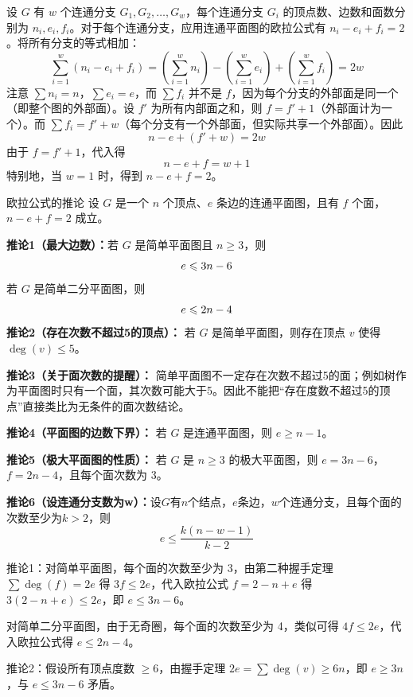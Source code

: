 设 $G$ 有 $w$ 个连通分支 $G_1, G_2, \dots, G_w$，每个连通分支 $G_i$ 的顶点数、边数和面数分别为 $n_i, e_i, f_i$。对于每个连通分支，应用连通平面图的欧拉公式有 $n_i - e_i + f_i = 2$。将所有分支的等式相加：
\[
\sum_{i=1}^w (n_i - e_i + f_i) =\left(\sum_{i=1}^w n_i\right) - \left(\sum_{i=1}^w e_i\right) + \left(\sum_{i=1}^w f_i\right) = 2w
\]
注意 $\sum n_i = n$，$\sum e_i = e$，而 $\sum f_i$ 并不是 $f$，因为每个分支的外部面是同一个（即整个图的外部面）。设 $f'$ 为所有内部面之和，则 $f = f' + 1$（外部面计为一个）。而 $\sum f_i = f' + w$（每个分支有一个外部面，但实际共享一个外部面）。因此
\[
n - e + (f' + w) = 2w
\]
由于 $f = f' + 1$，代入得
\[
n - e + f = w + 1
\]
特别地，当 $w=1$ 时，得到 $n - e + f = 2$。
\begin{theorem}{欧拉公式的推论}{}
    设 $G$ 是一个 $n$ 个顶点、$e$ 条边的连通平面图，且有 $f$ 个面，$n-e+f=2$ 成立。

\textbf{推论1（最大边数）：}若 $G$ 是简单平面图且 $n \geqslant 3$，则\vspace{-10pt}
\[
e \leqslant 3n - 6\vspace{-10pt}
\]
若 $G$ 是简单二分平面图，则\vspace{-10pt}
\[
e \leqslant 2n - 4\vspace{-10pt}
\]
\textbf{推论2（存在次数不超过5的顶点）：}
若 $G$ 是简单平面图，则存在顶点 $v$ 使得 $\deg(v) \leqslant 5$。

\textbf{推论3（关于面次数的提醒）：}
简单平面图不一定存在次数不超过5的面；例如树作为平面图时只有一个面，其次数可能大于5。因此不能把“存在度数不超过5的顶点”直接类比为无条件的面次数结论。

\textbf{推论4（平面图的边数下界）：}
若 $G$ 是连通平面图，则 $e \geqslant n-1$。

\textbf{推论5（极大平面图的性质）：}
若 $G$ 是 $n \geqslant 3$ 的极大平面图，则 $e = 3n-6$，$f = 2n-4$，且每个面次数为 3。

\textbf{推论6（设连通分支数为w）：}设$G$有$n$个结点，$e$条边，$w$个连通分支，且每个面的次数至少为$k>2$，则\vspace{-10pt}\[e\leqslant \dfrac{k(n-w-1)}{k-2}\]
\end{theorem}
推论1：对简单平面图，每个面的次数至少为 3，由第二种握手定理 $\sum \deg(f) = 2e$ 得 $3f \leqslant 2e$，代入欧拉公式 $f = 2 - n + e$ 得 $3(2-n+e) \leqslant 2e$，即 $e \leqslant 3n-6$。

对简单二分平面图，由于无奇圈，每个面的次数至少为 4，类似可得 $4f \leqslant 2e$，代入欧拉公式得 $e \leqslant 2n-4$。

推论2：假设所有顶点度数 $\geqslant 6$，由握手定理 $2e = \sum \deg(v) \geqslant 6n$，即 $e \geqslant 3n$，与 $e \leqslant 3n-6$ 矛盾。


